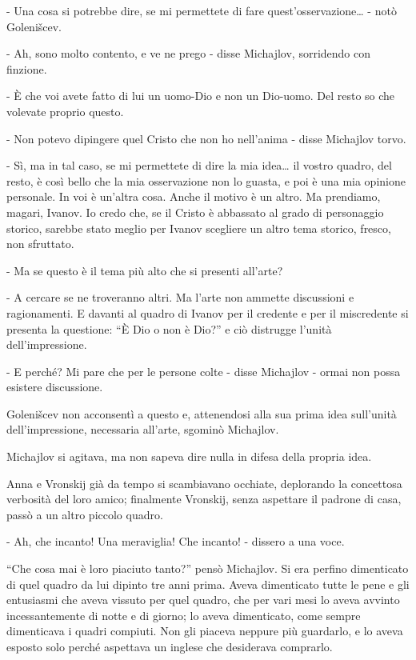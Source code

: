 - Una cosa si potrebbe dire, se mi permettete di fare quest'osservazione\ldots{} - notò Golenišcev. 

- Ah, sono molto contento, e ve ne prego - disse Michajlov, sorridendo con finzione. 

- È che voi avete fatto di lui un uomo-Dio e non un Dio-uomo. Del resto so che volevate proprio questo. 

- Non potevo dipingere quel Cristo che non ho nell'anima - disse Michajlov torvo. 

- Sì, ma in tal caso, se mi permettete di dire la mia idea\ldots{} il vostro quadro, del resto, è così bello che la mia osservazione non lo guasta, e poi è una mia opinione personale. In voi è un'altra cosa. Anche il motivo è un altro. Ma prendiamo, magari, Ivanov. Io credo che, se il Cristo è abbassato al grado di personaggio storico, sarebbe stato meglio per Ivanov scegliere un altro tema storico, fresco, non sfruttato. 

- Ma se questo è il tema più alto che si presenti all'arte? 

- A cercare se ne troveranno altri. Ma l'arte non ammette discussioni e ragionamenti. E davanti al quadro di Ivanov per il credente e per il miscredente si presenta la questione: ``È Dio o non è Dio?'' e ciò distrugge l'unità dell'impressione. 

- E perché? Mi pare che per le persone colte - disse Michajlov - ormai non possa esistere discussione. 

Golenišcev non acconsentì a questo e, attenendosi alla sua prima idea sull'unità dell'impressione, necessaria all'arte, sgominò Michajlov. 

Michajlov si agitava, ma non sapeva dire nulla in difesa della propria idea. 

Anna e Vronskij già da tempo si scambiavano occhiate, deplorando la concettosa verbosità del loro amico; finalmente Vronskij, senza aspettare il padrone di casa, passò a un altro piccolo quadro. 

- Ah, che incanto! Una meraviglia! Che incanto! - dissero a una voce. 

``Che cosa mai è loro piaciuto tanto?'' pensò Michajlov. Si era perfino dimenticato di quel quadro da lui dipinto tre anni prima. Aveva dimenticato tutte le pene e gli entusiasmi che aveva vissuto per quel quadro, che per vari mesi lo aveva avvinto incessantemente di notte e di giorno; lo aveva dimenticato, come sempre dimenticava i quadri compiuti. Non gli piaceva neppure più guardarlo, e lo aveva esposto solo perché aspettava un inglese che desiderava comprarlo. 

